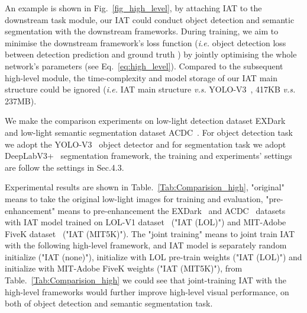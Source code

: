 \documentclass{bmvc2k}
\begin{document}
An example is shown in Fig.~\ref{fig_high_level},
by attaching IAT to the downstream task module, our IAT could conduct object detection and semantic segmentation with the downstream frameworks. During training, we aim to minimise the downstream framework's loss function (\textit{i.e.} object detection loss  between detection prediction  and ground truth ) by jointly optimising the whole network's parameters (see Eq.~\ref{eq:high_level}).
Compared to the subsequent high-level module, the time-complexity and model storage of  our IAT main structure could be ignored (\textit{i.e.} IAT main structure \textit{v.s.} YOLO-V3~\cite{yolov3}, 417KB \textit{v.s.} 237MB).



We make the comparison experiments on low-light detection dataset EXDark~\cite{EXDark} and low-light semantic segmentation dataset ACDC~\cite{ACDC}. For object detection task we adopt the YOLO-V3~\cite{yolov3} object detector and for segmentation task we adopt DeepLabV3+~\cite{Deeplabv3plus} segmentation framework, the training and experiments' settings are follow the settings in Sec.4.3. 

Experimental results are shown in Table.~\ref{Tab:Comparision_high}, "original" means to take the original low-light images for training and evaluation, "pre-enhancement" means to pre-enhancement the EXDark~\cite{EXDark} and ACDC~\cite{ACDC} datasets with IAT model trained on LOL-V1 dataset~\cite{LOL_dataset} ("IAT (LOL)") and MIT-Adobe FiveK dataset~\cite{fivek_dataset} ("IAT (MIT5K)"). The "joint training" means to joint train IAT with the following high-level framework, and IAT model is separately random initialize ("IAT (none)"), initialize with LOL pre-train weights ("IAT (LOL)") and initialize with MIT-Adobe FiveK weights ("IAT (MIT5K)"), from Table.~\ref{Tab:Comparision_high} we could see that joint-training IAT with the high-level frameworks would further improve high-level visual performance, on both of object detection and semantic segmentation task.
\end{document}
